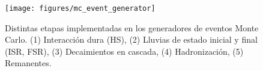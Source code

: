 \begin{figure}[h]
  \centering
  \texttt{[image: figures/mc\_event\_generator]}
  \caption{Distintas etapas implementadas en los generadores de eventos Monte Carlo.
    (1) Interacción dura (HS), (2) Lluvias de estado inicial y final (ISR, FSR),
    (3) Decaimientos en cascada, (4) Hadronización, (5) Remanentes.}
  \label{fig:mc_event_generator}
\end{figure}





